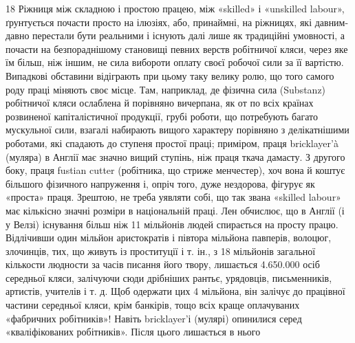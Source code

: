 18    Ріжниця між складною і простою працею, між «skilled» і «unskilled
labour», ґрунтується почасти просто на ілюзіях, або, принаймні,
на ріжницях, які давним-давно перестали бути реальними і існують далі
лише як традиційні умовності, а почасти на безпораднішому становищі
певних верств робітничої кляси, через яке їм більш, ніж іншим, не сила
вибороти оплату своєї робочої сили за її вартістю. Випадкові обставини
відіграють при цьому таку велику ролю, що того самого роду праці міняють
своє місце. Там, наприклад, де фізична сила (Substanz) робітничої кляси
ослаблена й порівняно вичерпана, як от по всіх країнах розвиненої капіталістичної
продукції, грубі роботи, що потребують багато мускульної сили,
взагалі набирають вищого характеру порівняно з делікатнішими роботами,
які спадають до ступеня простої праці; приміром, праця bricklayer’à (муляра)
в Англії має значно вищий ступінь, ніж праця ткача дамасту.
З другого боку, праця fustian cutter (робітника, що стриже менчестер),
хоч вона й коштує більшого фізичного напруження і, опріч того, дуже нездорова,
фігурує як «проста» праця. Зрештою, не треба уявляти собі, що
так звана «skilled labour» має кількісно значні розміри в національній
праці. Лен обчислює, що в Англії (і у Велзі) існування більш ніж
11 мільйонів людей спирається на просту працю. Відлічивши один мільйон
аристократів і півтора мільйона павперів, волоцюг, злочинців, тих, що
живуть із проституції і т. ін., з 18 мільйонів загальної кількости людности
за часів писання його твору, лишається 4.650.000 осіб середньої
кляси, залічуючи сюди дрібніших рантьє, урядовців, письменників,
артистів, учителів і т. д. Щоб одержати цих 4 мільйона, він залічує до
працівної частини середньої кляси, крім банкірів, тощо всіх краще оплачуваних
«фабричних робітників»! Навіть bricklayer’і (мулярі) опинилися
серед «кваліфікованих робітників». Після цього лишається в нього
